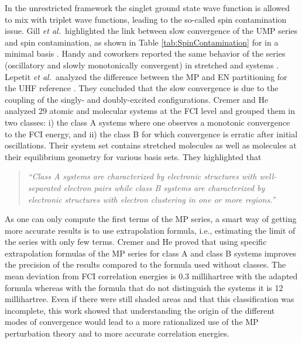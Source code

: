 \documentclass[11pt,a4paper]{article}
\begin{document}
In the unrestricted framework the singlet ground state wave function is allowed to mix with triplet wave functions, leading to the so-called spin contamination issue. Gill \textit{et al.}~highlighted the link between slow convergence of the UMP series and spin contamination, as shown in Table \ref{tab:SpinContamination} for  in a minimal basis \cite{Gill_1988}. 
Handy and coworkers reported the same behavior of the series (oscillatory and slowly monotonically convergent) in stretched  and  systems \cite{Handy_1985}. Lepetit \textit{et al.}~analyzed the difference between the MP and EN partitioning for the UHF reference \cite{Lepetit_1988}. They concluded that the slow convergence is due to the coupling of the singly- and doubly-excited configurations. 
Cremer and He analyzed 29 atomic and molecular systems at the FCI level \cite{Cremer_1996} and grouped them in two classes: i) the class A systems where one observes a monotonic convergence to the FCI energy, and ii) the class B for which convergence is erratic after initial oscillations. Their system set contains stretched molecules as well as molecules at their equilibrium geometry for various basis sets. They highlighted that \cite{Cremer_1996}
\begin{quote}
	\textit{``Class A systems are characterized by electronic structures with well-separated electron pairs while class B systems are characterized by electronic structures with electron clustering in one or more regions.''}
\end{quote}
As one can only compute the first terms of the MP series, a smart way of getting more accurate results is to use extrapolation formula, i.e., estimating the limit of the series with only few terms. 
Cremer and He proved that using specific extrapolation formulas of the MP series for class A and class B systems improves the precision of the results compared to the formula used without classes. The mean deviation from FCI correlation energies is $0.3$ millihartree with the adapted formula whereas with the formula that do not distinguish the systems it is 12 millihartree. 
Even if there were still shaded areas and that this classification was incomplete, this work showed that understanding the origin of the different modes of convergence would lead to a more rationalized use of the MP perturbation theory and to more accurate correlation energies.
\end{document}
